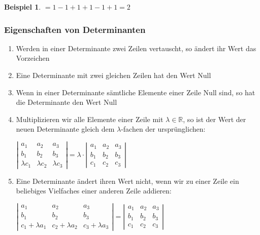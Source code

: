 \documentclass[a4paper,10pt]{report}
\newtheorem{myexample}{Beispiel}
\newcommand{\R}{{\mathbb R}}
\begin{document}
\begin{myexample}
\vspace{0.5cm}

\hspace{0.8cm} $ = 1 - 1 + 1 + 1 - 1 + 1 = 2$
\end{myexample}
\newpage
\subsubsection{Eigenschaften von Determinanten }
\begin{enumerate}
\item Werden in einer Determinante zwei Zeilen vertauscht, so
\"{a}ndert ihr Wert das Vorzeichen
\item Eine Determinante mit zwei gleichen Zeilen hat den Wert Null
\item Wenn in einer Determinante s\"{a}mtliche Elemente einer Zeile
Null sind, so hat die Determinante den Wert Null
\item Multiplizieren wir alle Elemente einer Zeile mit $\lambda
\in \R$, so ist der Wert der neuen Determinante gleich dem
$\lambda$-fachen der urspr\"{u}nglichen:

\vspace{0.4cm}
$\left | \begin {array}{ccc} a_1 & a_2 & a_3\\
                                     b_1 & b_2 & b_3\\
                                     \lambda c_1 & \lambda c_2 & \lambda c_3 \end{array} \right |
                                     =
\lambda \cdot \left | \begin {array}{ccc} a_1 & a_2 & a_3\\
                                     b_1 & b_2 & b_3\\
                                     c_1 & c_2 & c_3 \end{array} \right
                                     |$
\vspace{0.4cm}
\item Eine Determinante \"{a}ndert ihren Wert nicht, wenn wir zu einer
Zeile ein beliebiges Vielfaches einer anderen Zeile addieren:

\vspace{0.4cm}

$\left | \begin {array}{ccc} a_1 & a_2 & a_3\\
                                     b_1 & b_2 & b_3\\
                                     c_1 +\lambda a_1 & c_2 + \lambda a_2 & c_3 +\lambda a_3 \end{array} \right |
                                     =
\left | \begin {array}{ccc} a_1 & a_2 & a_3\\
                                     b_1 & b_2 & b_3\\
                                     c_1 & c_2 & c_3 \end{array} \right
                                     |$
\end{enumerate}
\end{document}
